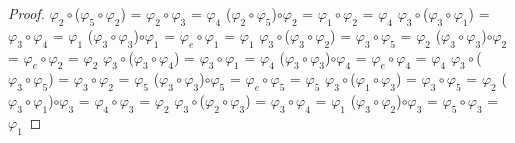 \documentclass[10pt,a4paper,oneside]{article}
\begin{document}
\begin{proof}
				\newline
				$\varphi_{2}\circ$($\varphi_{5}\circ\varphi_{2}$) = $\varphi_{2}\circ\varphi_{3}$ = $\varphi_{4}$
				\newline
				($\varphi_{2}\circ\varphi_{5}$)$\circ\varphi_{2}$ = $\varphi_{1}\circ\varphi_{2}$ = $\varphi_{4}$
				\newline
				\newline
				$\varphi_{3}\circ$($\varphi_{3}\circ\varphi_{1}$) = $\varphi_{3}\circ\varphi_{4}$ = $\varphi_{1}$
				\newline
				($\varphi_{3}\circ\varphi_{3}$)$\circ\varphi_{1}$ = $\varphi_{e}\circ\varphi_{1}$ = $\varphi_{1}$
				\newline
				\newline
				$\varphi_{3}\circ$($\varphi_{3}\circ\varphi_{2}$) = $\varphi_{3}\circ\varphi_{5}$ = $\varphi_{2}$
				\newline
				($\varphi_{3}\circ\varphi_{3}$)$\circ\varphi_{2}$ = $\varphi_{e}\circ\varphi_{2}$ = $\varphi_{2}$
				\newline
				\newline
				$\varphi_{3}\circ$($\varphi_{3}\circ\varphi_{4}$) = $\varphi_{3}\circ\varphi_{1}$ = $\varphi_{4}$
				\newline
				($\varphi_{3}\circ\varphi_{3}$)$\circ\varphi_{4}$ = $\varphi_{e}\circ\varphi_{4}$ = $\varphi_{4}$
				\newline
				\newline
				$\varphi_{3}\circ$($\varphi_{3}\circ\varphi_{5}$) = $\varphi_{3}\circ\varphi_{2}$ = $\varphi_{5}$
				\newline
				($\varphi_{3}\circ\varphi_{3}$)$\circ\varphi_{5}$ = $\varphi_{e}\circ\varphi_{5}$ = $\varphi_{5}$
				\newline
				\newline
				$\varphi_{3}\circ$($\varphi_{1}\circ\varphi_{3}$) = $\varphi_{3}\circ\varphi_{5}$ = $\varphi_{2}$
				\newline
				($\varphi_{3}\circ\varphi_{1}$)$\circ\varphi_{3}$ = $\varphi_{4}\circ\varphi_{3}$ = $\varphi_{2}$
				\newline
				\newline
				$\varphi_{3}\circ$($\varphi_{2}\circ\varphi_{3}$) = $\varphi_{3}\circ\varphi_{4}$ = $\varphi_{1}$
				\newline
				($\varphi_{3}\circ\varphi_{2}$)$\circ\varphi_{3}$ = $\varphi_{5}\circ\varphi_{3}$ = $\varphi_{1}$
				\newline
				\newline

\end{proof}
\end{document}
